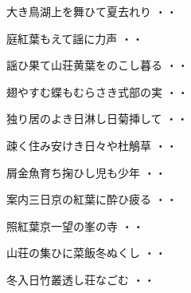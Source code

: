 \begin{shiika}大き鳥湖上を舞ひて夏去れり
\hfill{・・}\end{shiika}
\vspace{0.6cm}
\begin{shiika}庭紅葉もえて謡に力声
\hfill{・・}\end{shiika}
\vspace{0.6cm}
\begin{shiika}謡ひ果て山荘黄葉をのこし暮る
\hfill{・・}\end{shiika}
\vspace{0.6cm}
\begin{shiika}翅やすむ蝶もむらさき式部の実
\hfill{・・}\end{shiika}
\vspace{0.6cm}
\begin{shiika}独り居のよき日淋し日菊挿して
\hfill{・・}\end{shiika}
\vspace{0.6cm}
\begin{shiika}疎く住み安けき日々や杜鵤草
\hfill{・・}\end{shiika}
\vspace{0.6cm}
\begin{shiika}屑金魚育ち掬ひし児も少年
\hfill{・・}\end{shiika}
\vspace{0.6cm}
\begin{shiika}案内三日京の紅葉に酔ひ疲る
\hfill{・・}\end{shiika}
\vspace{0.6cm}
\begin{shiika}照紅葉京一望の峯の寺
\hfill{・・}\end{shiika}
\vspace{0.6cm}
\begin{shiika}山荘の集ひに菜飯冬ぬくし
\hfill{・・}\end{shiika}
\vspace{0.6cm}
\begin{shiika}冬入日竹叢透し荘なごむ
\hfill{・・}\end{shiika}
\vspace{0.6cm}
